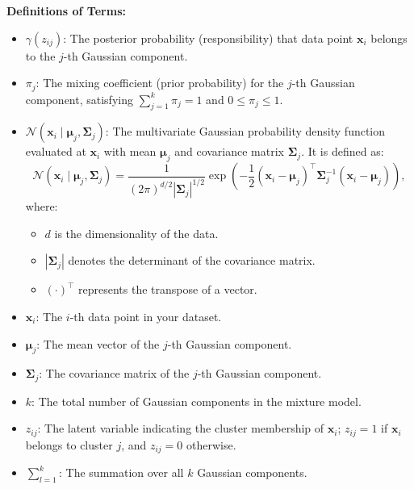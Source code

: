 \textbf{Definitions of Terms:}

\begin{itemize}
    \item \(\gamma(z_{ij})\): The posterior probability (responsibility) that data point \(\mathbf{x}_i\) belongs to the \(j\)-th Gaussian component.
    \item \(\pi_j\): The mixing coefficient (prior probability) for the \(j\)-th Gaussian component, satisfying \(\sum_{j=1}^{k} \pi_j = 1\) and \(0 \leq \pi_j \leq 1\).
    \item \(\mathcal{N}(\mathbf{x}_i \mid \boldsymbol{\mu}_j, \boldsymbol{\Sigma}_j)\): The multivariate Gaussian probability density function evaluated at \(\mathbf{x}_i\) with mean \(\boldsymbol{\mu}_j\) and covariance matrix \(\boldsymbol{\Sigma}_j\). It is defined as:
    \begin{equation}
    \mathcal{N}(\mathbf{x}_i \mid \boldsymbol{\mu}_j, \boldsymbol{\Sigma}_j) = \frac{1}{(2\pi)^{d/2} |\boldsymbol{\Sigma}_j|^{1/2}} \exp\left( -\frac{1}{2} (\mathbf{x}_i - \boldsymbol{\mu}_j)^\top \boldsymbol{\Sigma}_j^{-1} (\mathbf{x}_i - \boldsymbol{\mu}_j) \right),
    \end{equation}
    where:
    \begin{itemize}
        \item \(d\) is the dimensionality of the data.
        \item \(|\boldsymbol{\Sigma}_j|\) denotes the determinant of the covariance matrix.
        \item \((\cdot)^\top\) represents the transpose of a vector.
    \end{itemize}
    \item \(\mathbf{x}_i\): The \(i\)-th data point in your dataset.
    \item \(\boldsymbol{\mu}_j\): The mean vector of the \(j\)-th Gaussian component.
    \item \(\boldsymbol{\Sigma}_j\): The covariance matrix of the \(j\)-th Gaussian component.
    \item \(k\): The total number of Gaussian components in the mixture model.
    \item \(z_{ij}\): The latent variable indicating the cluster membership of \(\mathbf{x}_i\); \(z_{ij} = 1\) if \(\mathbf{x}_i\) belongs to cluster \(j\), and \(z_{ij} = 0\) otherwise.
    \item \(\sum_{l=1}^{k}\): The summation over all \(k\) Gaussian components.
\end{itemize}

